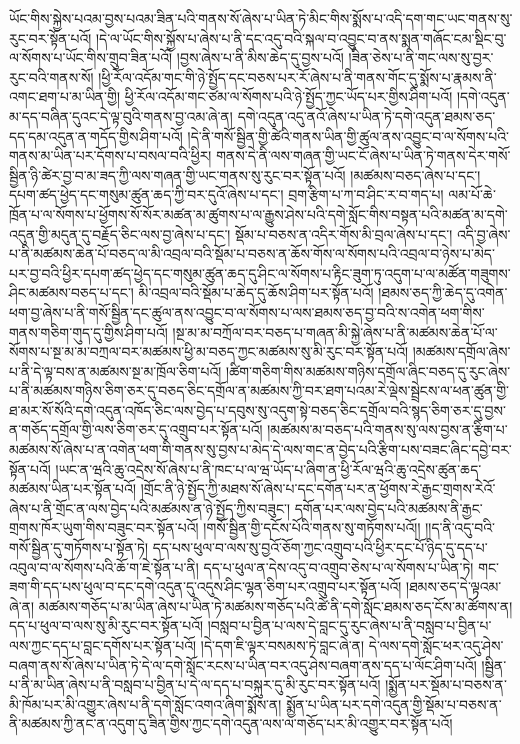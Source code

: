 ཡོང་གིས་སྐྱེས་པའམ་བྱས་པའམ་ཟིན་པའི་གནས་སོ་ཞེས་པ་ཡིན་ཏེ་མིང་གིས་སྨོས་པ་འདི་དག་གང་ཡང་གནས་སུ་རུང་བར་སྟོན་པའོ། །དེ་ལ་ཡོང་གིས་སྐྱོས་པ་ཞེས་པ་ནི་དང་འདུ་བའི་སྐལ་བ་འབྱུང་བ་ནས་སྨན་གཞོང་ངམ་སྡིང་བུ་ལ་སོགས་པ་ཡོང་གིས་གྲུབ་ཟིན་པའོ། །བྱས་ཞེས་པ་ནི་མིས་ཆེད་དུ་བྱས་པའོ། །ཟིན་ཅེས་པ་ནི་གང་ལས་སུ་བྱར་རུང་བའི་གནས་སོ། །ཕྱི་རོལ་འདོམ་གང་གི་ཉེ་སྤྱོད་དང་བཅས་པར་རོ་ཞེས་པ་ནི་གནས་གོང་དུ་སྨོས་པ་རྣམས་ནི་འགང་ཐག་པ་མ་ཡིན་གྱི། ཕྱི་རོལ་འདོམ་གང་ཙམ་ལ་སོགས་པའི་ཉེ་སྤྱོད་ཀྱང་ཡོད་པར་གྱིས་ཤིག་པའོ། །དགེ་འདུན་མ་དད་བཞིན་དུའང་དེ་ལྟ་བུའི་གནས་བྱ་འམ་ཞེ་ན། དགེ་འདུན་འདུ་ནའོ་ཞེས་པ་ཡིན་ཏེ་དགེ་འདུན་ཐམས་ཅད་དད་དམ་འདུན་ན་གདོད་གྱིས་ཤིག་པའོ། །དེ་ནི་གསོ་སྦྱིན་གྱི་ཚེའི་གནས་ཡིན་གྱི་ཚུལ་ནས་འབྱུང་བ་ལ་སོགས་པའི་གནས་མ་ཡིན་པར་དོགས་པ་བསལ་བའི་ཕྱིར། གནས་དེ་ནི་ལས་གཞན་གྱི་ཡང་ངོ་ཞེས་པ་ཡིན་ཏེ་གནས་དེར་གསོ་སྦྱིན་ཉི་ཚེར་བྱ་བ་མ་ཟད་ཀྱི་ལས་གཞན་གྱི་ཡང་གནས་སུ་རུང་བར་སྟོན་པའོ། །མཚམས་བཅད་ཞེས་པ་དང་། དཔག་ཚད་ཕྱེད་དང་གསུམ་ཚུན་ཆད་ཀྱི་བར་དུའོ་ཞེས་པ་དང་། བྲག་རྩིག་པ་ཀ་བ་ཤིང་ར་བ་གད་པ། ལམ་པོ་ཆེ་ཁྲོན་པ་ལ་སོགས་པ་ཕྱོགས་སོ་སོར་མཚན་མ་ཚུགས་པ་ལ་རྒྱུས་ཤེས་པའི་དགེ་སློང་གིས་བསྟན་པའི་མཚན་མ་དགེ་འདུན་གྱི་མདུན་དུ་བརྗོད་ཅིང་ལས་བྱ་ཞེས་པ་དང་། སྡོམ་པ་བཅས་ན་འདིར་གོས་མི་བྲལ་ཞེས་པ་དང་། འདི་བྱ་ཞེས་པ་ནི་མཚམས་ཆེན་པོ་བཅད་ལ་མི་འབྲལ་བའི་སྡོམ་པ་བཅས་ན་ཆོས་གོས་ལ་སོགས་པའི་འབྲལ་བ་ཉེས་པ་མེད་པར་བྱ་བའི་ཕྱིར་དཔག་ཚད་ཕྱེད་དང་གསུམ་ཚུན་ཆད་དུ་ཤིང་ལ་སོགས་པ་རྟིང་ཟུག་ཏུ་འདུག་པ་ལ་མཚོན་གཟུགས་ཤིང་མཚམས་བཅད་པ་དང་། མི་འབྲལ་བའི་སྡོམ་པ་ཆེད་དུ་ཆོས་ཤིག་པར་སྟོན་པའོ། །ཐམས་ཅད་ཀྱི་ཆེད་དུ་འགེན་ཕག་བྱ་ཞེས་པ་ནི་གསོ་སྦྱིན་དང་ཚུལ་ནས་འབྱུང་བ་ལ་སོགས་པ་ལས་ཐམས་ཅད་བྱ་བའི་ས་འགེན་ཕག་གིས་གནས་གཅིག་གུད་དུ་གྱིས་ཤིག་པའོ། །སྔ་མ་མ་བཀྲོལ་བར་བཅད་པ་གཞན་མི་སྐྱེ་ཞེས་པ་ནི་མཚམས་ཆེན་པོ་ལ་སོགས་པ་སྔ་མ་མ་བཀྲལ་བར་མཚམས་ཕྱི་མ་བཅད་ཀྱང་མཚམས་སུ་མི་རུང་བར་སྟོན་པའོ། །མཚམས་དགྲོལ་ཞེས་པ་ནི་དེ་ལྟ་བས་ན་མཚམས་སྔ་མ་ཁྲོལ་ཅིག་པའོ། །ཚིག་གཅིག་གིས་མཚམས་གཉིས་དགྲོལ་ཞིང་བཅད་དུ་རུང་ཞེས་པ་ནི་མཚམས་གཉིས་ཅིག་ཅར་དུ་བཅད་ཅིང་དགྲོལ་ན་མཚམས་ཀྱི་བར་ཐག་པའམ་རེ་ལྡེས་སྦྲེངས་ལ་ཕན་ཚུན་གྱི་ཐ་མར་སོ་སོའི་དགེ་འདུན་འཁོད་ཅིང་ལས་བྱེད་པ་དབུས་སུ་འདུག་སྟེ་བཅད་ཅིང་དགྲོལ་བའི་སྙད་ཅིག་ཅར་དུ་བྱས་ན་གཅོད་དགྲོལ་གྱི་ལས་ཅིག་ཅར་དུ་འགྲུབ་པར་སྟོན་པའོ། །མཚམས་མ་བཅད་པའི་གནས་སུ་ལས་བྱས་ན་རྩིག་པ་མཚམས་སོ་ཞེས་པ་ན་འགེན་ཕག་གི་གནས་སུ་བྱས་པ་མེད་དེ་ལས་གང་ན་བྱེད་པའི་རྩིག་པས་བཟང་ཞིང་དབྱེ་བར་སྟོན་པའོ། །ཡང་ན་ཝའི་ཆུ་འདྲེས་སོ་ཞེས་པ་ནི་ཁང་པ་ལ་ཝ་ཡོད་པ་ཞིག་ན་ཕྱི་རོལ་ཝའི་ཆུ་འདྲེས་ཚུན་ཆད་མཚམས་ཡིན་པར་སྟོན་པའོ། །གྲོང་ནི་ཉེ་སྤྱོད་ཀྱི་མཐས་སོ་ཞེས་པ་དང་དགོན་པར་ན་ཕྱོགས་རེ་རྒྱང་གྲགས་རེའོ་ཞེས་པ་ནི་གྲོང་ན་ལས་བྱེད་པའི་མཚམས་ན་ཉེ་སྤྱོད་ཀྱིས་བཟུང་། དགོན་པར་ལས་བྱེད་པའི་མཚམས་ནི་རྒྱང་གྲགས་ཁོར་ཡུག་གིས་བཟུང་བར་སྟོན་པའོ། །གསོ་སྦྱིན་གྱི་དངོས་པོའི་གནས་སུ་གཏོགས་པའོ།། །།ད་ནི་འདུ་བའི་གསོ་སྦྱིན་དུ་གཏོགས་པ་སྟོན་ཏེ། དད་པས་ཕུལ་བ་ལས་སུ་བྱའོ་ཅོག་ཀྱང་འགྲུབ་པའི་ཕྱིར་དང་པོ་ཉིད་དུ་དད་པ་འབུལ་བ་ལ་སོགས་པའི་ཆོ་ག་ཇེ་སྟོན་པ་ནི། དད་པ་ཕུལ་ན་དེས་འདུ་བ་འགྲུབ་ཅེས་པ་ལ་སོགས་པ་ཡིན་ཏེ། གང་ཟག་གི་དད་པས་ཕུལ་བ་དང་དགེ་འདུན་དུ་འདུས་ཤིང་ལྷན་ཅིག་པར་འགྲུབ་པར་སྟོན་པའོ། །ཐམས་ཅད་དེ་ལྟའམ་ཞེ་ན། མཚམས་གཅོད་པ་མ་ཡིན་ཞེས་པ་ཡིན་ཏེ་མཚམས་གཅོད་པའི་ཚེ་ནི་དགེ་སློང་ཐམས་ཅད་ངོས་མ་ཚོགས་ན། དད་པ་ཕུལ་བ་ལས་སུ་མི་རུང་བར་སྟོན་པའོ། །བསླབ་པ་བྱིན་པ་ལས་དེ་བླང་དུ་རུང་ཞེས་པ་ནི་བསླབ་པ་བྱིན་པ་ལས་ཀྱང་དད་པ་བླང་དགོས་པར་སྟོན་པའོ། །དེ་དག་ཇི་ལྟར་བསམས་ཏེ་བླང་ཞེ་ན། དེ་ལས་དགེ་སློང་ཕར་འདུ་ཤེས་བཞག་ནས་སོ་ཞེས་པ་ཡིན་ཏེ་དེ་ལ་དགེ་སློང་རངས་པ་ཡིན་བར་འདུ་ཤེས་བཞག་ནས་དད་པ་ལོང་ཤིག་པའོ། །སྦྱིན་པ་ནི་མ་ཡིན་ཞེས་པ་ནི་བསླབ་པ་བྱིན་པ་དེ་ལ་དད་པ་བསྐུར་དུ་མི་རུང་བར་སྟོན་པའོ། །སྨྱོན་པར་སྡོམ་པ་བཅས་ན་མི་ཁོམ་པར་མི་འགྱུར་ཞེས་པ་ནི་དགེ་སློང་འགའ་ཞིག་སྨོས་ན། སྨྱོན་པ་ཡིན་པར་དགེ་འདུན་གྱི་སྡོམ་པ་བཅས་ན་ནི་མཚམས་ཀྱི་ནང་ན་འདུག་དུ་ཟིན་གྱིས་ཀྱང་དགེ་འདུན་ལས་ལ་གཅོད་པར་མི་འགྱུར་བར་སྟོན་པའོ། 